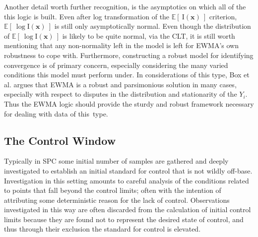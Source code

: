\documentclass[12pt]{article}
\newcommand{\E}[1]{
        \mathbb{E}\left[~#1~\right]
}
\def \Eix {
	\mathbb{E}\left[~\text{I}(\bm{x})~\right]
}
\def \ix {
	\text{I}(\bm{x})
}
\begin{document}
	
	Another detail worth further recognition, is the asymptotics on which all of the this logic is built.
	Even after log transformation of the $\Eix$ criterion, $\E{\log\ix}$ is still only asymptotically normal.
	Even though the distribution of $\E{\log\ix}$ is likely to be quite normal, via the CLT, it is still worth mentioning that any non-normality left in the model is left for EWMA's own robustness to cope with. 
	Furthermore, constructing a robust model for identifying convergence is of primary concern, especially considering the many varied conditions this model must perform under.
	In considerations of this type, Box et al. \cite{boxBook} argues that EWMA is a robust and parsimonious solution in many cases, especially with respect to disputes in the distribution and stationarity of the $Y_i$.
	Thus the EWMA logic should provide the sturdy and robust framework necessary for dealing with data of \mbox{this type.}  
 
	
	
	\subsection{The Control Window}
	
	Typically in SPC some initial number of samples are gathered and deeply investigated to establish an initial standard for control that is not wildly off-base.
	Investigation in this setting amounts to careful analysis of the conditions related to points that fall beyond the control limits; often with the intention of attributing some deterministic reason for the lack of control.
	Observations investigated in this way are often discarded from the calculation of initial control limits because they are found not to represent the desired state of control, and thus through their exclusion the standard for control is elevated.
	
\end{document}
